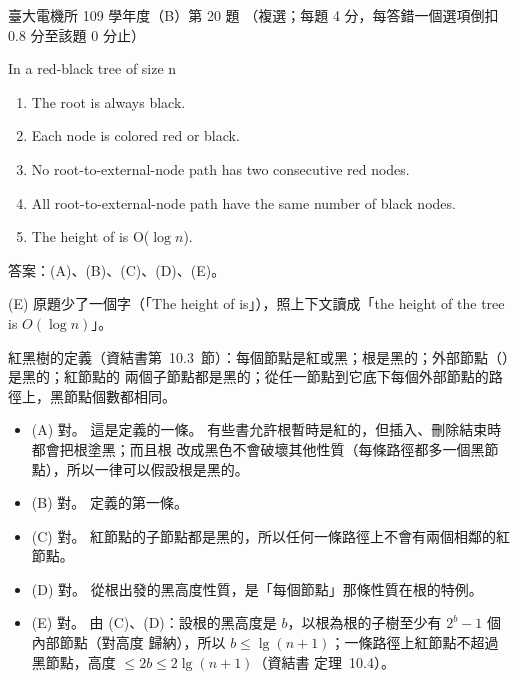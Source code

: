 \begin{pastexam}[label={px:ntu-109-ee-ds-20}]{臺大電機所 109 學年度（B）第 20 題}
（複選；每題 4 分，每答錯一個選項倒扣 0.8 分至該題 0 分止）

In a red-black tree of size n
\begin{enumerate}[label=(\Alph*)]
\item The root is always black.
\item Each node is colored red or black.
\item No root-to-external-node path has two consecutive red nodes.
\item All root-to-external-node path have the same number of black nodes.
\item The height of is O($\log n$).
\end{enumerate}
\end{pastexam}

\begin{pastsoln}
答案：(A)、(B)、(C)、(D)、(E)。

(E) 原題少了一個字（「The height of is」），照上下文讀成「the height of the tree is $O(\log n)$」。

紅黑樹的定義（資結書第~10.3~節）：每個節點是紅或黑；根是黑的；外部節點（\NIL）是黑的；紅節點的
兩個子節點都是黑的；從任一節點到它底下每個外部節點的路徑上，黑節點個數都相同。
\begin{itemize}
\item (A) 對。 這是定義的一條。 有些書允許根暫時是紅的，但插入、刪除結束時都會把根塗黑；而且根
改成黑色不會破壞其他性質（每條路徑都多一個黑節點），所以一律可以假設根是黑的。
\item (B) 對。 定義的第一條。
\item (C) 對。 紅節點的子節點都是黑的，所以任何一條路徑上不會有兩個相鄰的紅節點。
\item (D) 對。 從根出發的黑高度性質，是「每個節點」那條性質在根的特例。
\item (E) 對。 由 (C)、(D)：設根的黑高度是 $b$，以根為根的子樹至少有 $2^b - 1$ 個內部節點（對高度
歸納），所以 $b \le \lg(n+1)$；一條路徑上紅節點不超過黑節點，高度 $\le 2b \le 2\lg(n+1)$（資結書
定理~10.4）。
\end{itemize}
\end{pastsoln}
